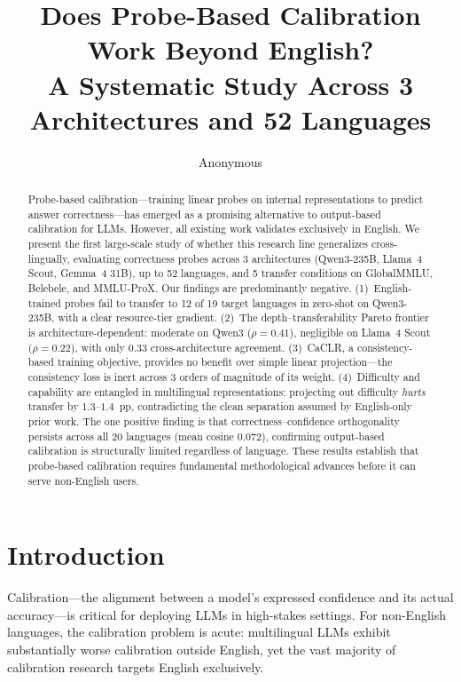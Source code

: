 \documentclass[11pt,a4paper]{article}
\title{Does Probe-Based Calibration Work Beyond English?\\A Systematic Study Across 3 Architectures and 52 Languages}
\author{Anonymous}
\begin{document}
\maketitle

\begin{abstract}
Probe-based calibration---training linear probes on internal representations to predict answer correctness---has emerged as a promising alternative to output-based calibration for LLMs.
However, all existing work validates exclusively in English.
We present the first large-scale study of whether this research line generalizes cross-lingually, evaluating correctness probes across 3 architectures (Qwen3-235B, Llama~4 Scout, Gemma~4 31B), up to 52 languages, and 5 transfer conditions on GlobalMMLU, Belebele, and MMLU-ProX.
Our findings are predominantly negative.
(1)~English-trained probes fail to transfer to 12 of 19 target languages in zero-shot on Qwen3-235B, with a clear resource-tier gradient.
(2)~The depth--transferability Pareto frontier is architecture-dependent: moderate on Qwen3 ($\rho{=}0.41$), negligible on Llama~4 Scout ($\rho{=}0.22$), with only $0.33$ cross-architecture agreement.
(3)~CaCLR, a consistency-based training objective, provides no benefit over simple linear projection---the consistency loss is inert across $3$ orders of magnitude of its weight.
(4)~Difficulty and capability are entangled in multilingual representations: projecting out difficulty \emph{hurts} transfer by $1.3$--$1.4$~pp, contradicting the clean separation assumed by English-only prior work.
The one positive finding is that correctness--confidence orthogonality persists across all 20 languages (mean cosine $0.072$), confirming output-based calibration is structurally limited regardless of language.
These results establish that probe-based calibration requires fundamental methodological advances before it can serve non-English users.
\end{abstract}

\section{Introduction}

Calibration---the alignment between a model's expressed confidence and its actual accuracy---is critical for deploying LLMs in high-stakes settings.
For non-English languages, the calibration problem is acute: multilingual LLMs exhibit substantially worse calibration outside English, yet the vast majority of calibration research targets English exclusively.
\end{document}
